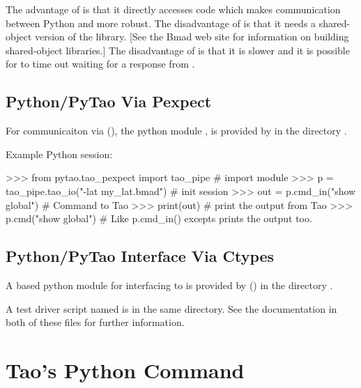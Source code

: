 The advantage of  is that it directly accesses \tao code
which makes communication between Python and \tao more robust. The disadvantage of  is
that it needs a shared-object version of the  library. [See the Bmad web site for
information on building shared-object libraries.] The disadvantage of  is that it is
slower and it is possible for  to time out waiting for a response from \tao.

\subsection{Python/PyTao Via Pexpect}

For communicaiton via  (), the python module , is
provided by  in the directory .

Example Python session:
\begin{example}
  >>> from pytao.tao_pexpect import tao_pipe  # import module
  >>> p = tao_pipe.tao_io("-lat my_lat.bmad") # init session
  >>> out = p.cmd_in("show global")           # Command to Tao
  >>> print(out)                              # print the output from Tao
  >>> p.cmd("show global")                    # Like p.cmd_in() excepts prints the output too.
\end{example}

\subsection{Python/PyTao Interface Via Ctypes}

A  based python module  for interfacing \tao to  is provided by
 () in the directory .

A test driver script named  is in the same directory. See the documentation in
both of these files for further information.

\section{Tao's Python Command}
\label{s:python.python}

